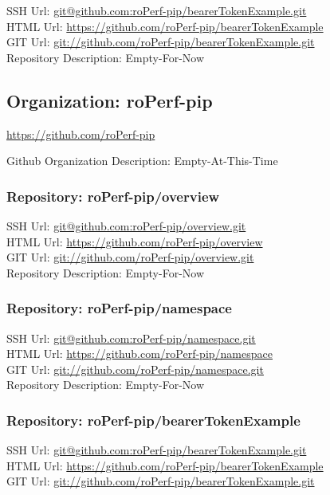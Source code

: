 SSH Url:  \url{git@github.com:roPerf-pip/bearerTokenExample.git}\\
HTML Url: \url{https://github.com/roPerf-pip/bearerTokenExample}\\
GIT Url:  \url{git://github.com/roPerf-pip/bearerTokenExample.git}\\


Repository Description: Empty-For-Now
\subsection{Organization: roPerf-pip}

\url{https://github.com/roPerf-pip}

Github Organization Description: Empty-At-This-Time

\subsubsection{Repository: roPerf-pip/overview}

SSH Url:  \url{git@github.com:roPerf-pip/overview.git}\\
HTML Url: \url{https://github.com/roPerf-pip/overview}\\
GIT Url:  \url{git://github.com/roPerf-pip/overview.git}\\


Repository Description: Empty-For-Now

\subsubsection{Repository: roPerf-pip/namespace}

SSH Url:  \url{git@github.com:roPerf-pip/namespace.git}\\
HTML Url: \url{https://github.com/roPerf-pip/namespace}\\
GIT Url:  \url{git://github.com/roPerf-pip/namespace.git}\\


Repository Description: Empty-For-Now

\subsubsection{Repository: roPerf-pip/bearerTokenExample}

SSH Url:  \url{git@github.com:roPerf-pip/bearerTokenExample.git}\\
HTML Url: \url{https://github.com/roPerf-pip/bearerTokenExample}\\
GIT Url:  \url{git://github.com/roPerf-pip/bearerTokenExample.git}\\


